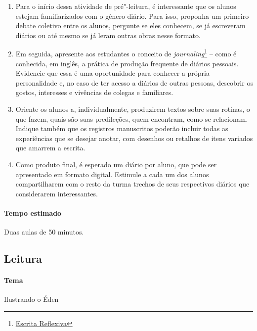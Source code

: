 \documentclass[12pt]{extarticle}
\begin{document}
\begin{enumerate}

\item
Para o início dessa atividade de pré"-leitura, é interessante que os
alunos estejam familiarizados com o gênero diário. Para isso, proponha um primeiro debate
coletivo entre os alunos, pergunte se eles conhecem, se já escreveram diários ou até mesmo se 
já leram outras obras nesse formato.

\item
Em seguida, apresente aos estudantes o conceito de \emph{journaling}\footnote{\href{https://www.youtube.com/watch?v=rg3YccyU4Bw&ab_channel=LigiaCosta-TGIToday}{Escrita Reflexiva}} -- como é conhecida, 
em inglês, a prática de produção frequente de diários pessoais. Evidencie que essa é uma 
oportunidade para conhecer a própria personalidade e, no caso de ter acesso a diários de 
outras pessoas, descobrir os gostos, interesses e vivências de colegas e familiares. 

\item
Oriente os alunos a, individualmente, produzirem textos sobre suas rotinas, o que fazem, 
quais são suas predileções, quem encontram, como se relacionam. Indique também que os 
registros manuscritos poderão incluir todas as experiências que se desejar anotar, com 
desenhos ou retalhos de itens variados que amarrem a escrita. 

\item
Como produto final, é esperado um diário por aluno, que pode ser apresentado 
em formato digital. Estimule a cada um dos alunos compartilharem com o resto da turma 
trechos de seus respectivos diários que considerarem interessantes. 

\end{enumerate}

\paragraph{Tempo estimado} Duas aulas de 50 minutos. 


\subsection{Leitura}


\paragraph{Tema} Ilustrando o Éden 
\end{document}
